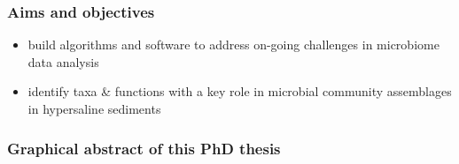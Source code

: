 \documentclass{beamer}
\begin{document}
   \begin{frame}
      \frametitle{Aims and objectives}
      \begin{itemize}
         \item  build algorithms and software to address on-going challenges in microbiome data analysis
         \bigskip
         \item  identify taxa \& functions with a key role in microbial community assemblages in hypersaline sediments
      \end{itemize}
   \end{frame}

   \begin{frame}
      \frametitle{Graphical abstract of this PhD thesis}

   \end{frame}
\end{document}
